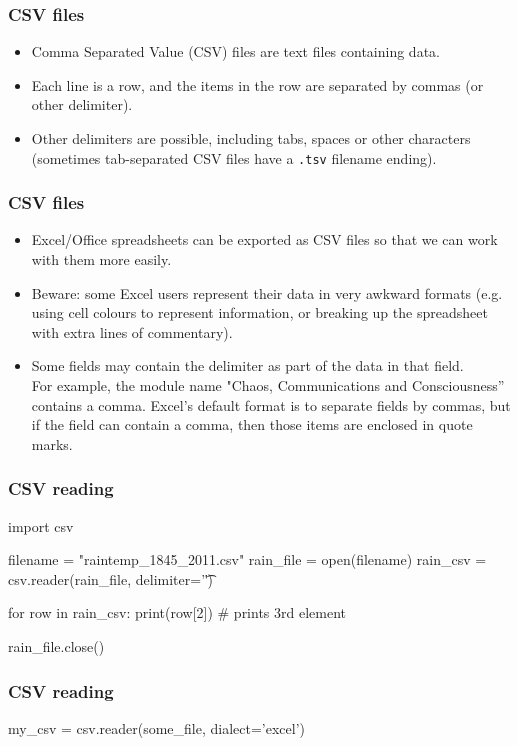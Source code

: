 \documentclass{beamer}
\begin{document}
\begin{frame}[fragile]
\frametitle{CSV files}
\begin{itemize}
\item Comma Separated Value (CSV) files are text files containing data. 

\item Each line is a row, and the items in the row are separated by commas (or other delimiter).

\item Other delimiters are possible, including tabs, spaces or other characters (sometimes tab-separated CSV files have a \texttt{.tsv} filename ending).
\end{itemize}
\end{frame}


\begin{frame}[fragile]
\frametitle{CSV files}
\begin{itemize}
\item Excel/Office spreadsheets can be exported as CSV files so that we can work with them more easily.

\item Beware: some Excel users represent their data in very awkward formats (e.g. using cell colours to represent information, or breaking up the spreadsheet with extra lines of commentary).

\item Some fields may contain the delimiter as part of the data in that field. \\For example, the module name "Chaos, Communications and Consciousness'' contains a comma. Excel's default format is to separate fields by commas, but if the field can contain a comma, then those items are enclosed in quote marks.
\end{itemize}
\end{frame}

\begin{frame}[fragile]
\frametitle{CSV reading}
\begin{code}
import csv

filename = "raintemp_1845_2011.csv"
rain_file = open(filename)
rain_csv = csv.reader(rain_file, delimiter='\t')

for row in rain_csv:
    print(row[2])  # prints 3rd element

rain_file.close()
\end{code}
\end{frame}

\begin{frame}[fragile]
\frametitle{CSV reading}
\begin{code}
my_csv = csv.reader(some_file, dialect='excel')
\end{code}
\end{frame}
\end{document}
